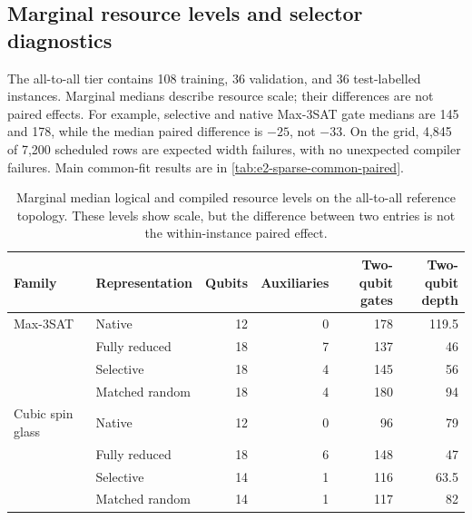 \documentclass[a4paper,onecolumn,11pt,unpublished]{quantumarticle}
\theoremstyle{remark}
\begin{document}
\subsection{Marginal resource levels and selector diagnostics}
\label{app:results-resources}

The all-to-all tier contains 108 training, 36 validation, and 36 test-labelled
instances. Marginal medians describe resource scale; their differences are
not paired effects. For example, selective and native Max-3SAT gate medians
are 145 and 178, while the median paired difference is $-25$, not $-33$.
On the grid, 4,845 of 7,200 scheduled rows are expected width failures, with
no unexpected compiler failures. Main common-fit results are in
\cref{tab:e2-sparse-common-paired}.

\begin{table}[!htbp]
    \centering
    \small
    \caption{Marginal median logical and compiled resource levels on the
    all-to-all reference topology.  These levels show scale, but the difference
    between two entries is not the within-instance paired effect.}
    \label{tab:e2-all-to-all-resources}
    \begin{tabular}{@{}llrrrr@{}}
        \toprule
        Family & Representation
        & Qubits
        & Auxiliaries
        & \shortstack{Two-qubit\\gates}
        & \shortstack{Two-qubit\\depth}\\
        \midrule
        Max-3SAT & Native          & 12 & 0 & 178 & 119.5\\
                 & Fully reduced   & 18 & 7 & 137 & 46\\
                 & Selective       & 18 & 4 & 145 & 56\\
                 & Matched random  & 18 & 4 & 180 & 94\\
        \addlinespace
        Cubic spin glass & Native         & 12 & 0 & 96  & 79\\
                         & Fully reduced  & 18 & 6 & 148 & 47\\
                         & Selective      & 14 & 1 & 116 & 63.5\\
                         & Matched random & 14 & 1 & 117 & 82\\
        \bottomrule
    \end{tabular}
\end{table}
\end{document}
